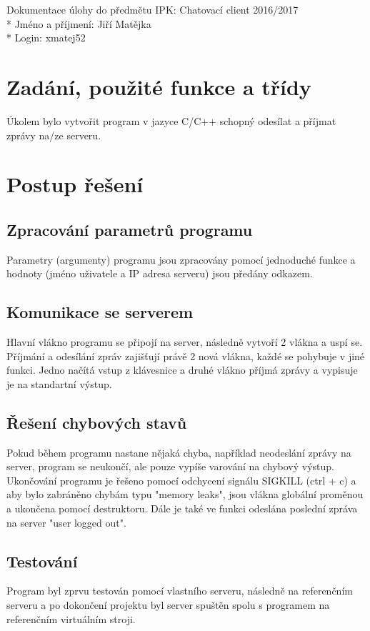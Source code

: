 \documentclass[a4paper, 10pt]{article}
\begin{document}
    \noindent
    Dokumentace úlohy do předmětu IPK: Chatovací client 2016/2017 \\*
    Jméno a příjmení: Jiří Matějka \\*
    Login: xmatej52

    \section{Zadání, použité funkce a třídy}
        Úkolem bylo vytvořit program v jazyce C/C++ schopný odesílat a příjmat
        zprávy na/ze serveru.
    \section{Postup řešení}
        \subsection{Zpracování parametrů programu}
            Parametry (argumenty) programu jsou zpracovány pomocí jednoduché funkce
            a hodnoty (jméno uživatele a IP adresa serveru) jsou předány odkazem.
        \subsection{Komunikace se serverem}
            Hlavní vlákno programu se připojí na server, následně vytvoří 2 vlákna
            a uspí se. Příjmání a odesílání zpráv zajišťují právě 2 nová vlákna,
            každé se pohybuje v jiné funkci. Jedno načítá vstup z klávesnice
            a druhé vlákno příjmá zprávy a vypisuje je na standartní výstup.
        \subsection{Řešení chybových stavů}
            Pokud během programu nastane nějaká chyba, například neodeslání zprávy
            na server, program se neukončí, ale pouze vypíše varování na chybový
            výstup. Ukončování programu je řešeno pomocí odchycení signálu
            SIGKILL (ctrl + c) a aby bylo zabráněno chybám typu "memory leaks",
            jsou vlákna globální proměnou a ukončena pomocí destruktoru. Dále
            je také ve funkci odeslána poslední zpráva na server "user logged out".
        \subsection{Testování}
            Program byl zprvu testován pomocí vlastního serveru,
            následně na referenčním serveru a po dokončení projektu byl server
            spuštěn spolu s programem na referenčním virtuálním stroji.
\end{document}
